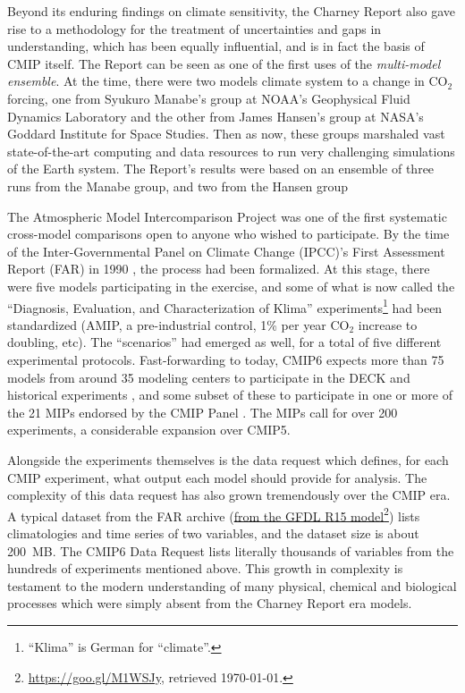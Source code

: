 \documentclass[gmd,manuscript]{copernicus}
\newcommand{\urlref}[2] {\href{#1}{#2}\footnote{\url{#1}, retrieved \today.}}
\begin{document}
Beyond its
enduring findings on climate sensitivity, the Charney Report also gave
rise to a methodology for the treatment of uncertainties and gaps in
understanding, which has been equally influential, and is in fact the
basis of CMIP itself. The Report can be seen as one of the first uses
of the \emph{multi-model ensemble}. At the time, there were two models
climate system to a change in CO$_2$ forcing, one from Syukuro
Manabe's group at NOAA's Geophysical Fluid Dynamics Laboratory and
the other from James Hansen's group at NASA's Goddard Institute for
Space Studies. Then as now, these groups marshaled vast
state-of-the-art computing and data resources to run very challenging
simulations of the Earth system. The Report's results were based on an
ensemble of
three runs from the Manabe group,
and two from the Hansen group

The Atmospheric Model Intercomparison Project
\citep[AMIP:][]{ref:gates1992} was one of the first systematic
cross-model comparisons open to anyone who wished to participate.
By the time of the Inter-Governmental Panel on Climate Change (IPCC)'s
First Assessment Report (FAR) in 1990 \citep{ref:houghtonetal1992},
the process had been formalized. At this stage, there were
five models participating in the exercise, and some of what
is now called the ``Diagnosis, Evaluation, and Characterization of
Klima'' \citep[DECK, see][]{ref:eyringetal2016a}
experiments\footnote{``Klima'' is German for ``climate''.} had been
standardized (AMIP, a pre-industrial control, 1\% per year CO$_2$
increase to doubling, etc). The ``scenarios'' had emerged as well, for
a total of
five different experimental protocols. Fast-forwarding to today, CMIP6
expects more than 75 models from around 35 modeling centers \citep[in
14 countries, a stark contrast to the US monopoly
in][]{ref:charneyetal1979} to participate in the DECK and historical
experiments \citep[Table~2 of][]{ref:eyringetal2016a}, and some subset
of these to participate in one or more of the 21 MIPs endorsed by the
CMIP Panel \citep[Table~3 of][, now 23 with two new endorsed MIPs
since]{ref:eyringetal2016a}.
The MIPs call for over 200 experiments, a considerable expansion over
CMIP5.

Alongside the experiments themselves is the data request which
defines, for each CMIP experiment, what output each model should
provide for analysis. The complexity of this data request has also
grown tremendously over the CMIP era. A typical dataset from the FAR
archive (\urlref{https://goo.gl/M1WSJy}{from the GFDL R15 model}) lists
climatologies and time series of two variables, and the dataset size
is about 200~MB. The CMIP6 Data Request \cite{ref:juckesetal2015}
lists literally thousands of variables from the hundreds of
experiments mentioned above. This growth in complexity is testament to
the modern understanding of many physical, chemical and biological
processes which were simply absent from the Charney Report era models.
\end{document}

